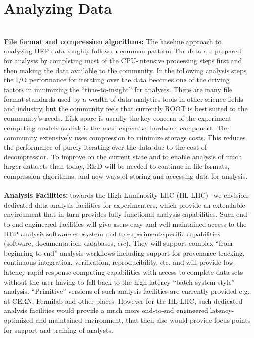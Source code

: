\documentclass[12pt,a4paper]{article}
\begin{document}
\section{Analyzing Data}~\\
{\bf File format and compression algorithms:} The baseline approach to analyzing HEP data roughly follows a common pattern: The data are prepared for analysis by completing most of the CPU-intensive processing steps first and then making the data available to the community. In the following analysis steps the I/O performance for iterating over the data becomes one of the driving factors in minimizing the ``time-to-insight'' for analyses. There are many file format standards used by a wealth of data analytics tools in other science fields and industry, but the community feels that currently ROOT is best suited to the community's needs. Disk space is usually the key concern of the experiment computing models as disk is the most expensive hardware component. The community extensively uses compression to minimize storage costs. This reduces the performance of purely iterating over the data due to the cost of decompression. To improve on the current state and to enable analysis of much larger datasets than today, R\&D will be needed to continue in file formats, compression algorithms, and new ways of storing and accessing data for analysis. \\ \\
{\bf Analysis Facilities:} towards the High-Luminosity LHC (HL-LHC)~\cite{Apollinari:2284929} we envision dedicated data analysis facilities for experimenters, which provide an extendable environment that in turn provides fully functional analysis capabilities. Such end-to-end engineered facilities will give users easy and well-maintained access to the HEP analysis software ecosystem and to experiment-specific capabilities (software, documentation, databases, {\it etc}). They will support complex ``from beginning to end'' analysis workflows including support for provenance tracking, continuous integration, verification, reproducibility, etc. and will provide low-latency rapid-response computing capabilities with access to complete data sets without the user having to fall back to the high-latency ``batch system style'' analysis. ``Primitive'' versions of such analysis facilities are currently provided e.g. at CERN, Fermilab and other places. However for the HL-LHC, such dedicated analysis facilities would provide a much more end-to-end engineered latency-optimized and maintained environment, that then also would provide focus points for support and training of analysts.\\ \\
\end{document}
